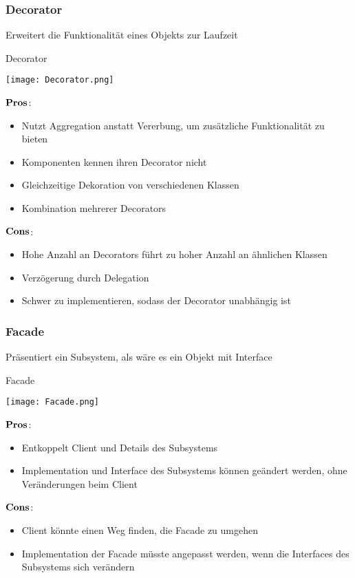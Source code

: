 \subsubsection{Decorator}
Erweitert die Funktionalität eines Objekts zur Laufzeit
\begin{table}[H]
\caption{Decorator}
\texttt{[image: Decorator.png]}	
\end{table}
\begin{multicols}{2}
$\bold{Pros}$:
\begin{itemize}
	\item Nutzt Aggregation anstatt Vererbung, um zusätzliche Funktionalität zu bieten
	\item Komponenten kennen ihren Decorator nicht
	\item Gleichzeitige Dekoration von verschiedenen Klassen
	\item Kombination mehrerer Decorators
\end{itemize}	
\columnbreak
$\bold{Cons}$:
\begin{itemize}
	\item Hohe Anzahl an Decorators führt zu hoher Anzahl an ähnlichen Klassen
	\item Verzögerung durch Delegation
	\item Schwer zu implementieren, sodass der Decorator unabhängig ist 
\end{itemize}
\end{multicols}
\subsubsection{Facade}
Präsentiert ein Subsystem, als wäre es ein Objekt mit Interface
\begin{table}[H]
\caption{Facade}
\texttt{[image: Facade.png]}
\end{table}
\begin{multicols}{2}
$\bold{Pros}$:
\begin{itemize}
	\item Entkoppelt Client und Details des Subsystems
	\item Implementation und Interface des Subsystems können geändert werden, ohne Veränderungen beim Client 
\end{itemize}
\columnbreak
$\bold{Cons}$:
\begin{itemize}
	\item Client könnte einen Weg finden, die Facade zu umgehen
	\item Implementation der Facade müsste angepasst werden, wenn die Interfaces des Subsystems sich verändern
\end{itemize}
\end{multicols}
